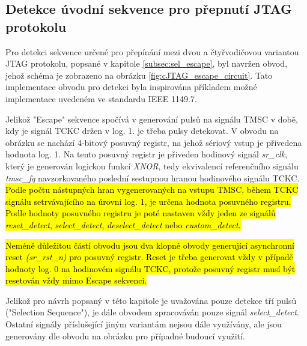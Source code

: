 \subsection{Detekce úvodní sekvence pro přepnutí \acs{JTAG} protokolu}	\label{subsec:sel_escape_det}
Pro detekci sekvence určené pro přepínání mezi dvou a čtyřvodičovou variantou \acs{JTAG} protokolu, popsané v kapitole \ref{subsec:sel_escape}, byl navržen obvod, jehož schéma je zobrazeno na obrázku \ref{fig:cJTAG_escape_circuit}. Tato implementace obvodu pro detekci byla inspirována příkladem možné implementace uvedeném ve standardu IEEE 1149.7.

Jelikož "Escape" sekvence spočívá v generování pulsů na signálu \acs{TMSC} v době, kdy je signál \acs{TCKC} držen v log. 1. je třeba pulsy detekovat. V obvodu na obrázku se nachází 4-bitový posuvný registr, na jehož sériový vstup je přivedena hodnota log. 1. Na tento posuvný registr je přiveden hodinový signál \textit{sr\_clk}, který je generován logickou funkcí \textit{XNOR}, tedy ekvivalencí referenčního signálu \textit{tmsc\_fq} navzorkovaného poslední sestupnou hranou hodinového signálu \acs{TCKC}. \hl{Podle počtu nástupných hran vygenerovaných na vstupu {\acs{TMSC}}, během {\acs{TCKC}} signálu setrvávajícího na úrovni log. 1, je určena hodnota posuvného registru. Podle hodnoty posuvného registru je poté nastaven vždy jeden ze signálů \textit{reset\_detect}, \textit{select\_detect}, \textit{deselect\_detect} nebo \textit{custom\_detect}.} %

\hl{Neméně důležitou částí obvodu jsou dva klopné obvody generující asynchronní reset \textit{(sr\_rst\_n)} pro posuvný registr. Reset je třeba generovat vždy v případě hodnoty log. 0 na hodinovém signálu {\acs{TCKC}}, protože posuvný registr musí být resetován vždy mimo Escape sekvenci.} %

Jelikož pro návrh popsaný v této kapitole je uvažována pouze detekce tří pulsů ("Selection Sequence"), je dále obvodem zpracováván pouze signál \textit{select\_detect}. Ostatní signály příslušející jiným variantám nejsou dále využívány, ale jsou generovány dle obvodu na obrázku pro případné budoucí využití.


